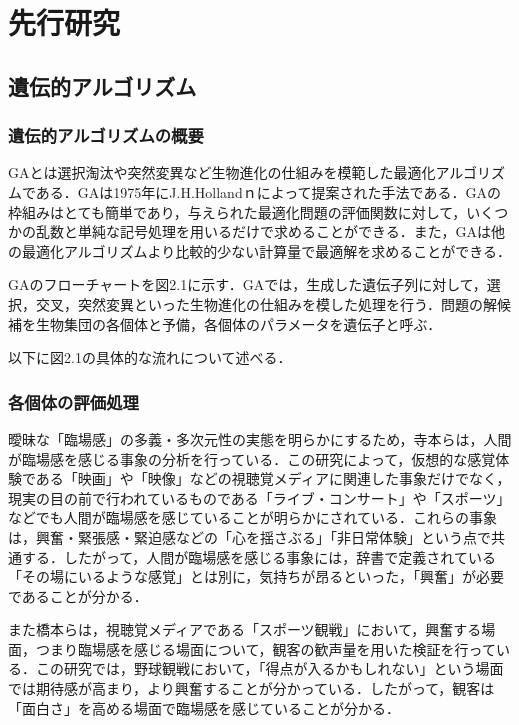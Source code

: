 \chapter{先行研究}
\thispagestyle{fancy} %
\lhead{}
\chead{}
\rhead{}
\lfoot{} 
\cfoot{\thepage}  
\rfoot{}
%

\section{遺伝的アルゴリズム}
\label{sec2.1}

\subsection{遺伝的アルゴリズムの概要}
\label{sec2.1.1}

GAとは選択淘汰や突然変異など生物進化の仕組みを模範した最適化アルゴリズムである．GAは1975年にJ.H.Hollandｎによって提案された手法である．GAの枠組みはとても簡単であり，与えられた最適化問題の評価関数に対して，いくつかの乱数と単純な記号処理を用いるだけで求めることができる．また，GAは他の最適化アルゴリズムより比較的少ない計算量で最適解を求めることができる．

GAのフローチャートを図2.1に示す．GAでは，生成した遺伝子列に対して，選択，交叉，突然変異といった生物進化の仕組みを模した処理を行う．問題の解候補を生物集団の各個体と予備，各個体のパラメータを遺伝子と呼ぶ．

以下に図2.1の具体的な流れについて述べる．


\subsection{各個体の評価処理}
\label{sec2.1.2}
  
曖昧な「臨場感」の多義・多次元性の実態を明らかにするため，寺本らは，人間が臨場感を感じる事象の分析を行っている\cite{rinjyo2}．この研究によって，仮想的な感覚体験である「映画」や「映像」などの視聴覚メディアに関連した事象だけでなく，現実の目の前で行われているものである「ライブ・コンサート」や「スポーツ」などでも人間が臨場感を感じていることが明らかにされている．これらの事象は，興奮・緊張感・緊迫感などの「心を揺さぶる」「非日常体験」という点で共通する．したがって，人間が臨場感を感じる事象には，辞書で定義されている「その場にいるような感覚」とは別に，気持ちが昂るといった，「興奮」が必要であることが分かる．

また橋本らは，視聴覚メディアである「スポーツ観戦」において，興奮する場面，つまり臨場感を感じる場面について，観客の歓声量を用いた検証を行っている\cite{rinjyo3}．この研究では，野球観戦において，「得点が入るかもしれない」という場面では期待感が高まり，より興奮することが分かっている．したがって，観客は「面白さ」を高める場面で臨場感を感じていることが分かる．


